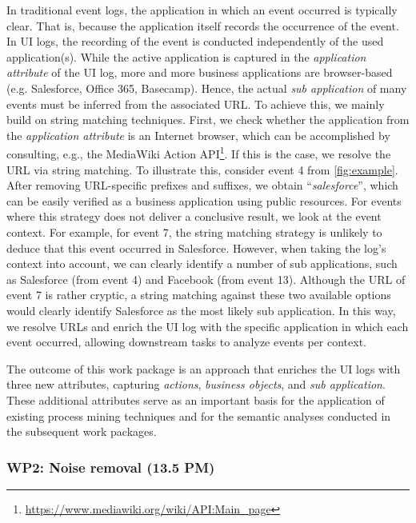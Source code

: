  In traditional event logs, the application in which an event occurred is typically clear. That is, because the application itself records the occurrence of the event. In UI logs, the recording of the event is conducted independently of the used application(s). While the active application is captured in the \textit{application attribute} of the UI log, more and more business applications are browser-based (e.g. Salesforce, Office 365, Basecamp). Hence, the actual \textit{sub application} of many events must be inferred from the associated URL. To achieve this, we mainly build on string matching techniques. First, we check whether the application from the \textit{application attribute} is an Internet browser, which can be accomplished by consulting, e.g., the 
MediaWiki Action API\footnote{\url{https://www.mediawiki.org/wiki/API:Main_page}}. If this is the case, we resolve the URL via string matching. To illustrate this, consider event 4 from \autoref{fig:example}. After removing URL-specific prefixes and suffixes, we obtain ``\textit{salesforce}'', which can be easily verified as a business application using public resources. For events where this strategy does not deliver a conclusive result, we look at the event context. For example, for event 7, the string matching strategy is unlikely to deduce that this event occurred in Salesforce. However, when taking the log's context into account, we can clearly identify a number of sub applications, such as Salesforce (from event 4) and Facebook (from event 13). Although the URL of event 7 is rather cryptic, a string matching against these two available options would clearly identify Salesforce as the most likely sub application. In this way, we resolve URLs and enrich the UI log with the specific application in which each event occurred, allowing downstream tasks to analyze events per context.

 The outcome of this work package is an approach that enriches the UI logs with three new attributes, capturing \textit{actions}, \textit{business objects}, and \textit{sub application}. These additional attributes serve as an important basis for the application of existing process mining techniques and for the semantic analyses conducted in the subsequent work packages.  


\subsubsection{WP2:  Noise removal (13.5 PM)}
\label{sec:wp2}

